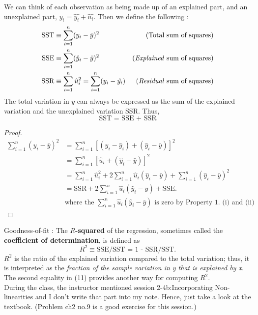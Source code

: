 \documentclass[a4paper, 10pt]{article}
\theoremstyle{definition}	%
\begin{document}
We can think of each observation as being made up of an explained part, and an unexplained part, $y_i = \hat{y_i} + \hat{u_i}$. Then we define the following \label{def:SST,SSE,SSR}:
\begin{align*}
    \text{SST} &\equiv \sum_{i=1}^{n} (y_i - \bar{y})^2 
    &\text{(Total sum of squares)}\\
    \text{SSE} &\equiv \sum_{i=1}^{n} (\hat{y}_i - \bar{y})^2 
    &\text{(\textit{Explained} sum of squares)}\\
    \text{SSR} &\equiv \sum_{i=1}^{n} \hat{u}_i^2 = \sum_{i=1}^{n}(y_i - \hat{y_i})
    &\text{(\textit{Residual} sum of squares)}
\end{align*}
The total variation in $y$ can always be expressed as the sum of the explained variation and the unexplained variation SSR. Thus,
\begin{equation}
    \text{SST = SSE + SSR}
\end{equation}
\begin{proof}
    \begin{align*}
    \sum_{i=1}^{n} (y_i - \bar{y})^2 &= \sum_{i=1}^{n} \left[ (y_i - \hat{y}_i) + (\hat{y}_i - \bar{y}) \right]^2 \\
    &= \sum_{i=1}^{n} \left[ \hat{u}_i + (\hat{y}_i - \bar{y}) \right]^2 \\
    &= \sum_{i=1}^{n} \hat{u}_i^2 + 2 \sum_{i=1}^{n} \hat{u}_i (\hat{y}_i - \bar{y}) + \sum_{i=1}^{n} (\hat{y}_i - \bar{y})^2 \\
    &= \text{SSR} + 2 \sum_{i=1}^{n} \hat{u}_i (\hat{y}_i - \bar{y}) + \text{SSE}.\\
    &\text{where the $\sum_{i=1}^{n} \hat{u}_i (\hat{y}_i - \bar{y})$ is zero by Property 1. (i) and (ii)}
    \end{align*}
\end{proof}

Goodness-of-fit : The \textbf{$R$-squared} of the regression, sometimes called the \textbf{coefficient of determination}, is defined as
\begin{equation}
    R^2 \equiv \text{SSE/SST = 1 - SSR/SST.}
\end{equation}
$R^2$ is the ratio of the explained variation compared to the total variation; thus, it is interpreted as the \textit{fraction of the sample variation in y that is explained by x}. The second equality in (11) provides another way for computing $R^2$.\\
During the class, the instructor mentioned session 2-4b:Incorporating Non-linearities and I don't write that part into my note. Hence, just take a look at the textbook. (Problem ch2 no.9 is a good exercise for this session.)
\end{document}
